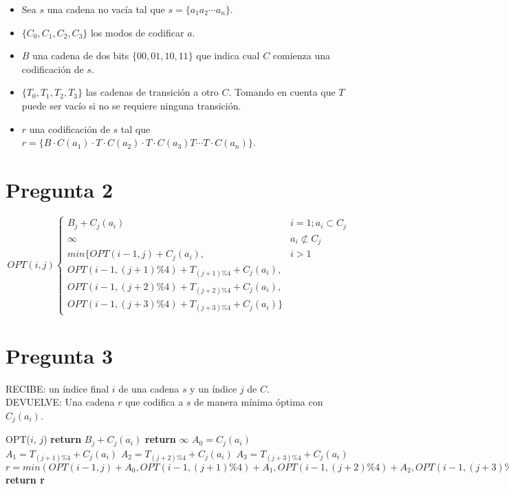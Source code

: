 \documentclass{article}
\begin{document}
    

\begin{itemize}
    \item Sea $s$ una cadena no vacía tal que $s = \{a_1a_2\cdots a_n\}$. 
    \item $\{C_0, C_1, C_2, C_3\}$ los modos de codificar $a$.
    \item $B$ una cadena de dos bits $\{00, 01, 10, 11\}$ que indica cual $C$ comienza una 
    codificación de $s$.
    \item $\{T_0, T_1, T_2, T_3\}$ las cadenas de transición a otro $C$. Tomando en cuenta que 
    $T$ puede ser vacío si no se requiere ninguna transición.
    \item $r$ una codificación de $s$ tal que $r=\{B \cdot C(a_1) \cdot T \cdot C(a_2) \cdot T 
    \cdot C(a_3) T \cdots T \cdot C(a_n)\}$.
\end{itemize}

\section{Pregunta 2}
\[ OPT(i, j) \begin{cases} 
    B_j + C_j(a_i) & i = 1; a_i \subset C_j \\
    \infty & a_i \not\subset C_j \\
    min\{OPT(i - 1, j) + C_j(a_i), & i > 1\\
    OPT(i - 1, (j+1) \%4) + T_{(j+1) \%4} + C_j(a_i), \\
    OPT(i - 1, (j+2) \%4) + T_{(j+2) \%4} +C_j(a_i), \\ OPT(i - 1, (j+3) \%4) + T_{(j+3) \%4} + C_j(a_i)\}
 \end{cases}
\]

\section{Pregunta 3}

\noindent RECIBE: un índice final $i$ de una cadena $s$ y un índice $j$ de $C$.\\
DEVUELVE: Una cadena $r$ que codifica a $s$ de manera mínima óptima con $C_j(a_i)$.

\begin{algorithmic}[1]
\item[]{OPT($i$, $j$)}
\State \textbf{return} $B_j + C_j(a_i)$
\State \textbf{return} $\infty$
\EndIf
\State $A_0 = C_j(a_i)$
\State $A_1 = T_{(j+1)\%4} + C_j(a_i)$
\State $A_2 = T_{(j+2)\%4} + C_j(a_i)$
\State $A_3 = T_{(j+3)\%4} + C_j(a_i)$
\State $r=min(OPT(i-1,j) + A_0, OPT(i-1,(j+1)\%4) + A_1, OPT(i-1,(j+2)\%4) + A_2, OPT(i-1,(j+3)\%4) + A_3)$
\State \textbf{return r} 
\end{algorithmic}
\end{document}
